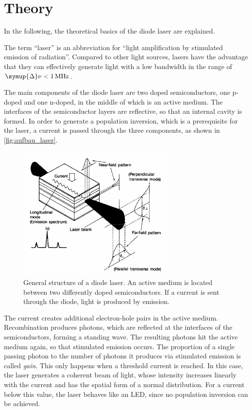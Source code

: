 \section{Theory}
\label{sec:theorie}

In the following, the theoretical basics of the diode laser are explained.

The term \enquote{laser} is an abbreviation for \enquote{light amplification by stimulated emission of radiation}.
Compared to other light sources, lasers have the advantage
that they can effectively generate light with a low bandwidth in the range of $\symup{\Delta}\nu < \SI{1}{\mega\hertz}$.

The main components of the diode laser are two doped semiconductors,
one p-doped and one n-doped,
in the middle of which is an active medium.
The interfaces of the semiconductor layers are reflective,
so that an internal cavity is formed.
In order to generate a population inversion,
which is a prerequisite for the laser,
a current is passed through the three components,
as shown in \autoref{fig:aufbau_laser}.
\begin{figure}
    \centering
    \includegraphics[width=0.7\textwidth]{content/img/p6_Fig2.png}
    \caption{
        General structure of a diode laser.
        An active medium is located between two differently doped semiconductors.
        If a current is sent through the diode, light is produced by emission.
        \cite{versuchsanleitung}
    }
    \label{fig:aufbau_laser}
\end{figure}
The current creates additional electron-hole pairs in the active medium.
Recombination produces photons,
which are reflected at the interfaces of the semiconductors,
forming a standing wave.
The resulting photons hit the active medium again,
so that stimulated emission occurs.
The proportion of
    a single passing photon
    to the number of photons it produces via stimulated emission
is called \emph{gain}.
This only happens when a threshold current is reached.
In this case, the laser generates a coherent beam of light,
whose intensity increases linearly with the current and has the spatial form of a normal distribution.
For a current below this value, the laser behaves like an LED,
since no population inversion can be achieved.

